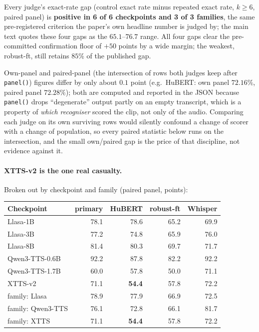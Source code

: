 \documentclass[11pt]{article}
\begin{document}
\noindent Every judge's exact-rate gap (control exact rate minus repeated
exact rate, $k\ge6$, paired panel) is \textbf{positive in 6 of 6 checkpoints
and 3 of 3 families}, the same pre-registered criterion the paper's own
headline number is judged by; the main text quotes these four gaps as the
$65.1$--$76.7$ range. All four gaps clear the pre-committed
confirmation floor of $+50$ points by a wide margin; the weakest, robust-ft,
still retains $85\%$ of the published gap.

Own-panel and paired-panel (the intersection of rows both judges keep after
\texttt{panel()}) figures differ by only about $0.1$ point (e.g.\ HuBERT: own
panel $72.16\%$, paired panel $72.28\%$); both are computed and reported in
the JSON because \texttt{panel()} drops ``degenerate'' output partly on an
empty transcript, which is a property of \emph{which recogniser} scored the
clip, not only of the audio. Comparing each judge on its own surviving rows
would silently confound a change of scorer with a change of population, so
every paired statistic below runs on the intersection, and the small own/paired
gap is the price of that discipline, not evidence against it.

\paragraph{XTTS-v2 is the one real casualty.} Broken out by checkpoint and
family (paired panel, points):

\begin{center}
\small
\begin{tabular}{lrrrr}
\toprule
Checkpoint & primary & HuBERT & robust-ft & Whisper \\
\midrule
Llasa-1B & 78.1 & 78.6 & 65.2 & 69.9 \\
Llasa-3B & 77.2 & 74.8 & 65.9 & 76.0 \\
Llasa-8B & 81.4 & 80.3 & 69.7 & 71.7 \\
Qwen3-TTS-0.6B & 92.2 & 87.8 & 82.2 & 92.2 \\
Qwen3-TTS-1.7B & 60.0 & 57.8 & 50.0 & 71.1 \\
XTTS-v2 & 71.1 & \textbf{54.4} & 57.8 & 72.2 \\
\midrule
family: Llasa & 78.9 & 77.9 & 66.9 & 72.5 \\
family: Qwen3-TTS & 76.1 & 72.8 & 66.1 & 81.7 \\
family: XTTS & 71.1 & \textbf{54.4} & 57.8 & 72.2 \\
\bottomrule
\end{tabular}
\end{center}
\end{document}
